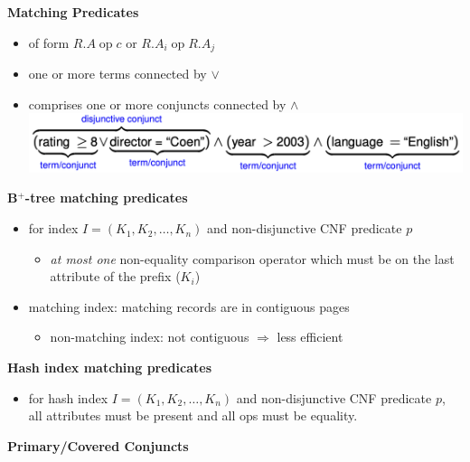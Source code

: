 \documentclass[8pt, landscape]{extarticle}
\begin{document}
\begin{multicols*}{4}
  \textbf{Matching Predicates}

  \begin{itemize}
    \item {} of form $R.A \;\mathrm{op}\; c$ or $R.A_i \;\mathrm{op}\; R.A_j$
    \item {} one or more terms connected by $\lor$
    \item {} comprises one or more conjuncts connected by $\land$
      \includegraphics[width=0.80\linewidth]{cs3223-cnf-predicate.png} 
  \end{itemize}

  \textbf{B$^+$-tree matching predicates}

  \begin{itemize}
    \item for index $I=(K_1, K_2, \dots, K_n)$ and non-disjunctive CNF predicate $p$ 
      \begin{itemize}
        \item \textit{at most one} non-equality comparison operator which must be on the last attribute of the prefix ($K_i$)
      \end{itemize}
    \item matching index: matching records are in contiguous pages
      \begin{itemize}
        \item non-matching index: not contiguous $\Rightarrow$ less efficient
      \end{itemize}
  \end{itemize}

  \textbf{Hash index matching predicates}

  \begin{itemize}
    \item for hash index $I = (K_1, K_2, \dots, K_n)$ and non-disjunctive CNF predicate $p$, all attributes must be present and all ops must be equality.
  \end{itemize}

  \textbf{Primary/Covered Conjuncts}


\end{multicols*}
\end{document}
